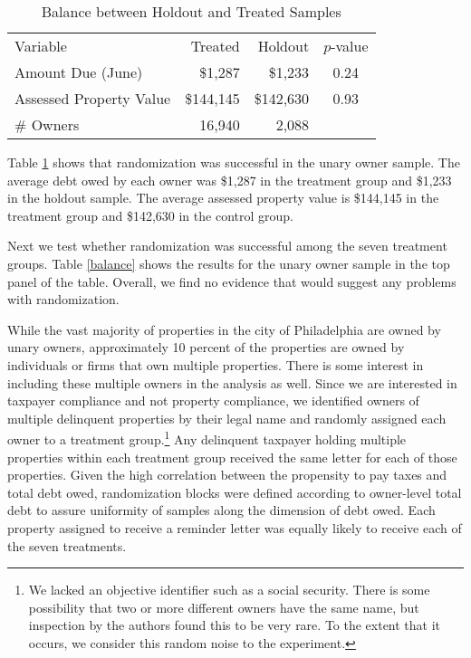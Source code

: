 \documentclass[12pt]{article}
\begin{document}
\begin{table}[ht]
\centering
\caption{Balance between Holdout and Treated Samples}\label{bal_hold}
\bigskip
\begin{tabular}{lrrc}
   \hline
Variable & Treated & Holdout & $p$-value \\ 
  Amount Due (June) & \$1,287 & \$1,233 & 0.24 \\ 
  Assessed Property Value & \$144,145 & \$142,630 & 0.93 \\ 
  \# Owners & 16,940 & 2,088 &  \\ 
   \hline
\end{tabular}
\end{table}

Table \ref{bal_hold} shows that randomization was successful in the
unary owner sample.  The average debt owed by each owner was \$1,287
in the treatment group and \$1,233 in the holdout sample. The average
assessed property value is \$144,145 in the treatment group and
\$142,630 in the control group.

Next we test whether randomization was successful among the seven
treatment groups. Table \ref{balance} shows the results for the unary
owner sample in the top panel of the table. Overall, we find no
evidence that would suggest any problems with randomization.

While the vast majority of properties in the city of Philadelphia are
owned by unary owners, approximately 10 percent of the properties are
owned by individuals or firms that own multiple properties. There is
some interest in including these multiple owners in the analysis as
well. Since we are interested in taxpayer compliance and not property
compliance, we identified owners of multiple delinquent properties by
their legal name and randomly assigned each owner to a treatment
group.\footnote{We lacked an objective identifier such as a social
  security.  There is some possibility that two or more different
  owners have the same name, but inspection by the authors found this
  to be very rare.  To the extent that it occurs, we consider this
  random noise to the experiment.} Any delinquent taxpayer holding
multiple properties within each treatment group received the same
letter for each of those properties.  Given the high correlation
between the propensity to pay taxes and total debt owed, randomization
blocks were defined according to owner-level total debt to assure
uniformity of samples along the dimension of debt owed. Each property
assigned to receive a reminder letter was equally likely to receive
each of the seven treatments.
\end{document}
